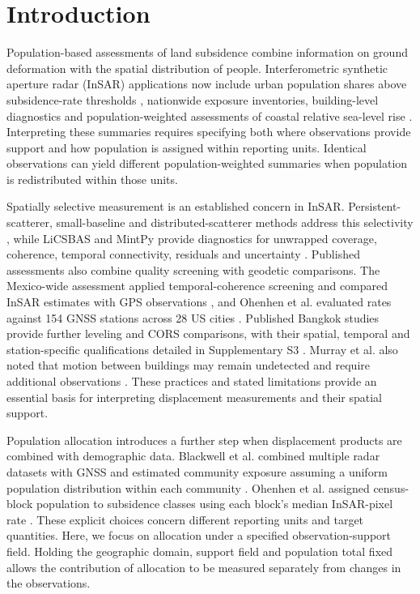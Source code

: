 \documentclass[pdflatex,lineno,sn-nature]{sn-jnl}
\begin{document}
\section{Introduction}
Population-based assessments of land subsidence combine information on ground deformation with the spatial distribution of people. Interferometric synthetic aperture radar (InSAR) applications now include urban population shares above subsidence-rate thresholds \citep{ao2024national}, nationwide exposure inventories, building-level diagnostics and population-weighted assessments of coastal relative sea-level rise \citep{xiong2026nationwide,yang2026buildingrisk,oelsmann2026coastal}. Interpreting these summaries requires specifying both where observations provide support and how population is assigned within reporting units. Identical observations can yield different population-weighted summaries when population is redistributed within those units.

Spatially selective measurement is an established concern in InSAR. Persistent-scatterer, small-baseline and distributed-scatterer methods address this selectivity \citep{ferretti2001ps,berardino2002sbas,ferretti2011squeeSAR}, while LiCSBAS and MintPy provide diagnostics for unwrapped coverage, coherence, temporal connectivity, residuals and uncertainty \citep{morishita2020licsbas,yunjun2019mintpy}. Published assessments also combine quality screening with geodetic comparisons. The Mexico-wide assessment applied temporal-coherence screening and compared InSAR estimates with GPS observations \citep{fernandeztorres2024mexico}, and Ohenhen et al. evaluated rates against 154 GNSS stations across 28 US cities \citep{ohenhen2025uscities}. Published Bangkok studies provide further leveling and CORS comparisons, with their spatial, temporal and station-specific qualifications detailed in Supplementary S3 \citep{luachapichatikul2020bangkok,pumpuang2024bangkapi,aieorattanawadee2022bangkok}. Murray et al. also noted that motion between buildings may remain undetected and require additional observations \citep{murray2025hawaii}. These practices and stated limitations provide an essential basis for interpreting displacement measurements and their spatial support.

Population allocation introduces a further step when displacement products are combined with demographic data. Blackwell et al. combined multiple radar datasets with GNSS and estimated community exposure assuming a uniform population distribution within each community \citep{blackwell2020california}. Ohenhen et al. assigned census-block population to subsidence classes using each block's median InSAR-pixel rate \citep{ohenhen2025uscities}. These explicit choices concern different reporting units and target quantities. Here, we focus on allocation under a specified observation-support field. Holding the geographic domain, support field and population total fixed allows the contribution of allocation to be measured separately from changes in the observations.
\end{document}
